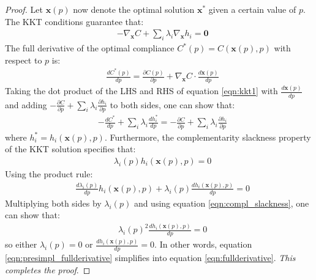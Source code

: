   \begin{proof}
    Let $\bm{x}(p)$ now denote the optimal solution $\bm{x}^*$ given a certain value of $p$. The KKT conditions guarantee that:
    \begin{align} \label{eqn:kkt1}
      & -\nabla_{\bm{x}} C + \sum_i \lambda_i \nabla_{\bm{x}} h_i = \bm{0}
    \end{align}
    The full derivative of the optimal compliance $C^*(p) = C(\bm{x}(p), p)$ with respect to $p$ is:
    \begin{align}
      & \frac{dC^*(p)}{dp} = \frac{\partial C(p)}{\partial p} + \nabla_{\bm{x}} C \cdot \frac{d\bm{x}(p)}{dp}
    \end{align}
    Taking the dot product of the LHS and RHS of equation \ref{eqn:kkt1} with $\frac{d\bm{x}(p)}{dp}$ and adding $-\frac{\partial C}{\partial p}  + \sum_i \lambda_i \frac{\partial h_i}{\partial p}$ to both sides, one can show that:
    \begin{align} \label{eqn:presimpl_fullderivative}
      & -\frac{dC^*}{dp} + \sum_i \lambda_i \frac{dh^*_i}{dp} = -\frac{\partial C}{\partial p}  + \sum_i \lambda_i \frac{\partial h_i}{\partial p}
    \end{align}
    where $h^*_i = h_i(\bm{x}(p), p)$.
    Furthermore, the complementarity slackness property of the KKT solution specifies that:
    \begin{align} \label{eqn:compl_slackness}
      & \lambda_i(p) h_i(\bm{x}(p), p) = 0
    \end{align}
    Using the product rule:
    \begin{align}
      & \frac{d\lambda_i(p)}{dp} h_i(\bm{x}(p), p) + \lambda_i(p) \frac{d h_i(\bm{x}(p), p)}{dp} = 0
    \end{align}
    Multiplying both sides by $\lambda_i(p)$ and using equation \ref{eqn:compl_slackness}, one can show that:
    \begin{align}
      & \lambda_i(p)^2 \frac{d h_i(\bm{x}(p), p)}{dp} = 0
    \end{align}
    so either $\lambda_i(p) = 0$ or $\frac{d h_i(\bm{x}(p), p)}{dp} = 0$. In other words, equation \ref{eqn:presimpl_fullderivative} simplifies into equation \ref{eqn:fullderivative}. \textit{This completes the proof}.
  \end{proof}

